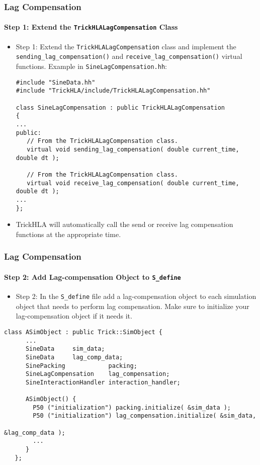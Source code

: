    \begin{frame}[fragile]
      \frametitle{Lag Compensation}
      \framesubtitle{Step 1: Extend the \texttt{TrickHLALagCompensation} Class}
      \begin{itemize}
         \item Step 1: Extend the \texttt{TrickHLALagCompensation} class and
         implement the \texttt{sending\_lag\_compensation()} and
         \texttt{receive\_lag\_compensation()} virtual functions. Example in
         \texttt{SineLagCompensation.hh}:
      \vspace{0.2cm}
\begin{Verbatim}[frame=single, fontsize=\tiny]
#include "SineData.hh"
#include "TrickHLA/include/TrickHLALagCompensation.hh"

class SineLagCompensation : public TrickHLALagCompensation
{
...
public:
   // From the TrickHLALagCompensation class.
   virtual void sending_lag_compensation( double current_time, double dt );

   // From the TrickHLALagCompensation class.
   virtual void receive_lag_compensation( double current_time, double dt );
...
};
\end{Verbatim}
         \item TrickHLA will automatically call the send or receive lag
         compensation functions at the appropriate time.
      \end{itemize}
   \end{frame}

   \begin{frame}[fragile]
      \frametitle{Lag Compensation}
      \framesubtitle{Step 2: Add Lag-compensation Object to \texttt{S\_define}}
      \begin{itemize}
         \item Step 2: In the \texttt{S\_define} file add a lag-compensation
         object to each simulation object that needs to perform lag compensation.
         Make sure to initialize your lag-compensation object if it needs it.
      \end{itemize}
\begin{Verbatim}[frame=single, fontsize=\scriptsize]
   class ASimObject : public Trick::SimObject {
      ...
      SineData     sim_data;
      SineData     lag_comp_data;
      SinePacking            packing;
      SineLagCompensation    lag_compensation;
      SineInteractionHandler interaction_handler;

      ASimObject() {
        P50 ("initialization") packing.initialize( &sim_data );
        P50 ("initialization") lag_compensation.initialize( &sim_data, 
                                                            &lag_comp_data );
        ...
      }
   };
\end{Verbatim}
   \end{frame}

